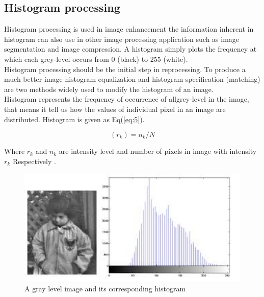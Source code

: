\subsection{Histogram processing}\label{subsec:histogram-processing}
Histogram processing is used in image enhancement the information inherent in histogram can also use in
other image processing application such as image segmentation and image compression. A histogram simply
plots the frequency at which each grey-level occurs from 0 (black) to 255 (white).\\
Histogram processing should be the initial step in reprocessing. To produce a much better image histogram
equalization and histogram specification (matching) are two methods widely used to modify the histogram of an image.\\
Histogram represents the frequency of occurrence of allgrey-level in the image, that means it tell
us how the values of individual pixel in an image are distributed.
Histogram is given as Eq(\ref{eq:5}).

        \begin{equation}
                (r_k) = n_k/N\label{eq:5}
        \end{equation}

\hspace{-0.6cm}Where $r_k$ and $n_k$ are intensity level and number of pixels in image with intensity $r_k$ Respectively \cite{1.13}.

        \begin{figure}[h]
                \centering
                \includegraphics[width=12cm]{chapiter1/figures/image-and-hist.png}
                \setlength{\fboxrule}{2pt}
                \caption{A gray level image and its corresponding histogram \cite{1.14}}
                \label{fig:figure1.12}
        \end{figure}

        \vspace{2cm}

